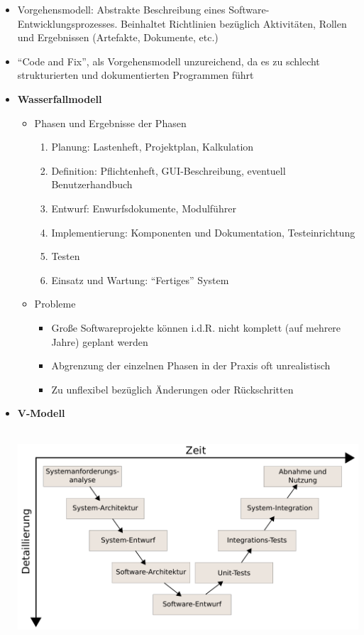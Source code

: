 \begin{itemize}
	\item Vorgehensmodell: Abstrakte Beschreibung eines Software-Entwicklungsprozesses. Beinhaltet Richtlinien bezüglich Aktivitäten, Rollen und Ergebnissen (Artefakte, Dokumente, etc.)
	\item "`Code and Fix"', als Vorgehensmodell unzureichend, da es zu schlecht strukturierten und dokumentierten Programmen führt
	\item \textbf{Wasserfallmodell}
	\begin{itemize}
		\item Phasen und Ergebnisse der Phasen
		\begin{enumerate}
			\item Planung: Lastenheft, Projektplan, Kalkulation
			\item Definition: Pflichtenheft, GUI-Beschreibung, eventuell Benutzerhandbuch
			\item Entwurf: Enwurfsdokumente, Modulführer
			\item Implementierung: Komponenten und Dokumentation, Testeinrichtung
			\item Testen
			\item Einsatz und Wartung: "`Fertiges"' System
		\end{enumerate}
		\item Probleme
		\begin{itemize}
			\item Große Softwareprojekte können i.d.R. nicht komplett (auf mehrere Jahre) geplant werden
			\item Abgrenzung der einzelnen Phasen in der Praxis oft unrealistisch
			\item Zu unflexibel bezüglich Änderungen oder Rückschritten
		\end{itemize}
	\end{itemize}
	\item \textbf{V-Modell} \\\\
		\begin{minipage}{\linewidth}
			\includegraphics[scale=0.8]{swt2/V-Modell.pdf}
		\end{minipage}
\end{itemize}